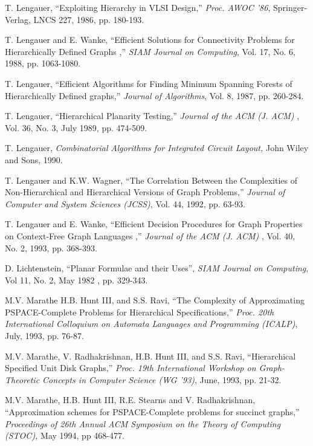 \begin{thebibliography}{HMRR93}
T. Lengauer,
``Exploiting Hierarchy in VLSI Design,''
{\em Proc.  AWOC '86}, 
Springer-Verlag, LNCS 227, 1986, pp. 180-193.
	
T. Lengauer and  E. Wanke,
``Efficient Solutions for Connectivity Problems for Hierarchically  
Defined Graphs ,''
{\em SIAM Journal on Computing}, 
Vol. 17, No. 6, 1988, pp. 1063-1080.




T. Lengauer,
``Efficient Algorithms for Finding Minimum Spanning Forests of 
Hierarchically Defined graphs,''
{\em Journal of Algorithms}, Vol. 8, 1987, pp. 260-284.


T. Lengauer,
``Hierarchical Planarity Testing,''
{\em Journal of the ACM (J. ACM) }, 
Vol. 36, No. 3, July 1989, pp. 474-509.


T. Lengauer,
{\em Combinatorial Algorithms for Integrated Circuit Layout,}
John Wiley and Sons, 1990.


T. Lengauer and  K.W. Wagner,
``The Correlation Between the Complexities of Non-Hierarchical and
Hierarchical Versions of Graph Problems,''
{\em Journal of Computer and System Sciences (JCSS)}, 
Vol. 44,  1992, pp. 63-93. 



T. Lengauer and  E. Wanke,
``Efficient Decision Procedures for Graph Properties on Context-Free 
Graph Languages ,''
{\em Journal of the ACM (J. ACM) }, 
Vol. 40, No. 2, 1993, pp. 368-393.



 D. Lichtenstein,
``Planar Formulae and their Uses'', 
{\em SIAM Journal on Computing},
Vol 11, No. 2, May 1982 , pp. 329-343.




 M.V. Marathe H.B. Hunt III,  and S.S. Ravi,
``The Complexity of Approximating PSPACE-Complete Problems for 
Hierarchical Specifications,''
{\em Proc. 20th 
International Colloquium on Automata Languages and Programming (ICALP)}, 
July, 1993, pp. 76-87.


M.V. Marathe, V. Radhakrishnan,  H.B. Hunt III,  and S.S. Ravi,
``Hierarchical Specified Unit Disk Graphs,''
{\em Proc. 19th International 
Workshop on Graph-Theoretic Concepts in Computer Science (WG '93)}, 
June, 1993, pp. 21-32. 




  M.V. Marathe, H.B. Hunt III, 
R.E. Stearns and V. Radhakrishnan,
``Approximation schemes for
PSPACE-Complete problems for succinct graphs,'' 
{\em Proceedings of 26th Annual ACM
Symposium on the Theory of Computing (STOC),} May 1994,
pp 468-477.





\end{thebibliography}
